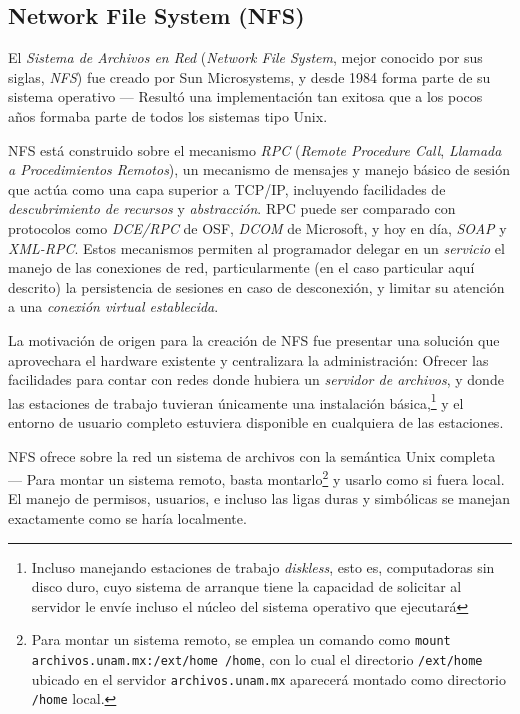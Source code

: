 \documentclass[11pt,fleqn]{book} %
\begin{document}
\subsection{Network File System (NFS)}
\label{sec-6-4-1}


El \emph{Sistema de Archivos en Red} (\emph{Network File System}, mejor conocido
por sus siglas, \emph{NFS}) fue creado por Sun Microsystems, y desde 1984
forma parte de su sistema operativo — Resultó una implementación tan
exitosa que a los pocos años formaba parte de todos los sistemas tipo
Unix.

NFS está construido sobre el mecanismo \emph{RPC} (\emph{Remote Procedure Call},
\emph{Llamada a Procedimientos Remotos}), un mecanismo de mensajes y manejo
básico de sesión que actúa como una capa superior a TCP/IP, incluyendo
facilidades de \emph{descubrimiento de recursos} y \emph{abstracción}. RPC puede
ser comparado con protocolos como \emph{DCE/RPC} de OSF, \emph{DCOM} de
Microsoft, y hoy en día, \emph{SOAP} y \emph{XML-RPC}. Estos mecanismos permiten
al programador delegar en un \emph{servicio} el manejo de las conexiones de
red, particularmente (en el caso particular aquí descrito) la
persistencia de sesiones en caso de desconexión, y limitar su atención
a una \emph{conexión virtual establecida}.

La motivación de origen para la creación de NFS fue presentar una
solución que aprovechara el hardware existente y centralizara la
administración: Ofrecer las facilidades para contar con redes donde
hubiera un \emph{servidor de archivos}, y donde las estaciones de trabajo
tuvieran únicamente una instalación básica,\footnote{Incluso manejando
estaciones de trabajo \emph{diskless}, esto es, computadoras sin disco
duro, cuyo sistema de arranque tiene la capacidad de solicitar al
servidor le envíe incluso el núcleo del sistema operativo que
ejecutará } y el entorno de usuario completo estuviera disponible en
cualquiera de las estaciones.

NFS ofrece sobre la red un sistema de archivos con la semántica Unix
completa — Para montar un sistema remoto, basta montarlo\footnote{Para
montar un sistema remoto, se emplea un comando como \texttt{mount
archivos.unam.mx:/ext/home /home}, con lo cual el directorio
\texttt{/ext/home} ubicado en el servidor \texttt{archivos.unam.mx} aparecerá
montado como directorio \texttt{/home} local. } y usarlo como si fuera local. El
manejo de permisos, usuarios, e incluso las ligas duras y simbólicas
se manejan exactamente como se haría localmente.
\end{document}
